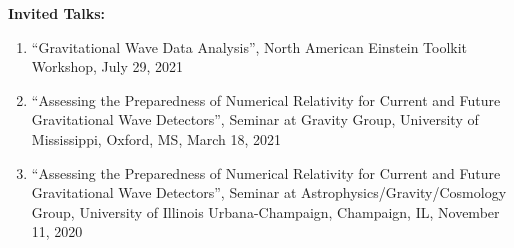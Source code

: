 \documentclass[11pt]{article}
\begin{document}
\begin{flushleft}
\vspace{8px}

\textbf{Invited Talks:}
  \begin{enumerate}
  \item ``Gravitational Wave Data Analysis'', North American Einstein Toolkit Workshop, July 29, 2021
  \item ``Assessing the Preparedness of Numerical Relativity for Current and Future Gravitational Wave Detectors'', Seminar at Gravity Group, University of Mississippi, Oxford, MS, March 18, 2021
  \item ``Assessing the Preparedness of Numerical Relativity for Current and Future Gravitational Wave Detectors'', Seminar at Astrophysics/Gravity/Cosmology Group, University of Illinois Urbana-Champaign, Champaign, IL, November 11, 2020
  \end{enumerate}


\end{flushleft}
\end{document}
